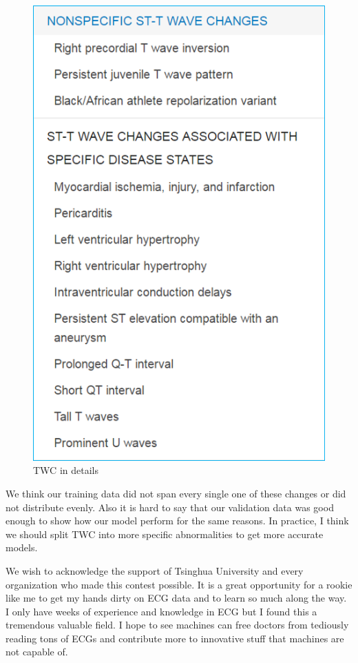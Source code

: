 \documentclass[%
 reprint,
 amsmath,amssymb,
 aps,
]{revtex4-2}
\begin{document}
\begin{figure}[H]
	\includegraphics[width=\linewidth]{img/twc2.png}
	\caption{\label{fig:twc2} TWC in details \cite{UptoDate}}
\end{figure}
We think our training data did not span every single one of these changes or did not distribute evenly. Also it is hard to say that our validation data was good enough to show how our model perform for the same reasons. In practice, I think we should split TWC into more specific abnormalities to get more accurate models.

\begin{acknowledgments}
We wish to acknowledge the support of Tsinghua University and every organization who made this contest possible. It is a great opportunity for a rookie like me to get my hands dirty on ECG data and to  learn so much along the way. I only have weeks of experience and knowledge in ECG but I found this a tremendous valuable field. I hope to see machines can free doctors from tediously reading tons of ECGs and contribute more to innovative stuff that machines are not capable of.
\end{acknowledgments}
\end{document}
